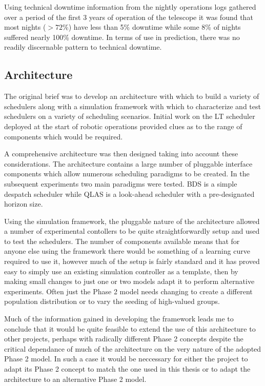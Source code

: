 Using technical downtime information from the nightly operations logs gathered over a period of the first 3 years of operation of the telescope it was found that most nights ($>72$\%) have less than 5\% downtime while some 8\% of nights suffered nearly 100\% downtime. In terms of use in prediction, there was no readily discernable pattern to technical downtime.
 


\subsection{Architecture}
The original brief was to develop an architecture with which to build a variety of schedulers along with a simulation framework with which to characterize and test schedulers on a variety of scheduling scenarios. Initial work on the LT scheduler deployed at the start of robotic operations provided clues as to the range of components which would be required. 

A comprehensive architecture was then designed taking into account these considerations. The architecture contains a large number of pluggable interface components which allow numerous scheduling paradigms to be created. In the subsequent experiments two main paradigms were tested. BDS is a simple despatch scheduler while QLAS is a look-ahead scheduler with a pre-designated horizon size. 

Using the simulation framework, the pluggable nature of the architecture allowed a number of experimental contollers to be quite straightforwardly setup and used to test the schedulers. The number of components available means that for anyone else using the framework there would be something of a learning curve required to use it, however much of the setup is fairly standard and it has proved easy to simply use an existing simulation controller as a template, then by making small changes to just one or two models adapt it to perform alternative experiments. Often just the Phase 2 model needs changing to create a different population distribution or to vary the seeding of high-valued groups.

Much of the information gained in developing the framework leads me to conclude that it would be quite feasible to extend the use of this architecture to other projects, perhaps with radically different Phase 2 concepts despite the critical dependance of much of the architecture on the very nature of the adopted Phase 2 model. In such a case it would be neccessary for either the project to adapt its Phase 2 concept to match the one used in this thesis or to adapt the architecture to an alternative Phase 2 model. 

